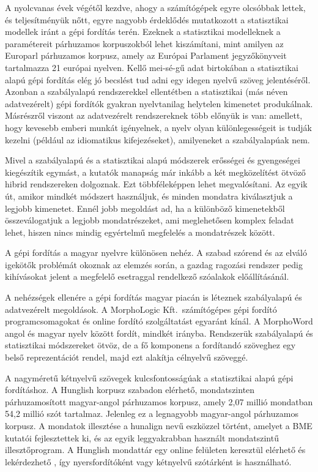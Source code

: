 \begin{multicols}{2}
  A nyolcvanas évek végétől kezdve, ahogy a számítógépek egyre olcsóbbak lettek, és teljesítményük nőtt, egyre nagyobb érdeklődés mutatkozott a statisztikai modellek iránt a gépi fordítás terén. Ezeknek a statisztikai modelleknek a paramétereit párhuzamos korpuszokból lehet kiszámítani, mint amilyen az Europarl pár\-hu\-za\-mos korpusz, amely az Európai Parlament jegyzőkönyveit tartalmazza 21 európai nyelven. Kellő mei-sé-gű adat birtokában a statisztikai alapú gépi fordítás elég jó becslést tud adni egy idegen nyelvű szöveg jelentéséről. Azonban a szabályalapú rendszerekkel ellentétben a statisztikai (más néven adatvezérelt) gépi fordítók gyakran nyelvtanilag helytelen kimenetet produkálnak. Másrészről vi\-szont az adatvezérelt rendszereknek több előnyük is van: amellett, hogy kevesebb emberi munkát igényelnek, a nyelv olyan különlegességeit is tudják kezelni (például az idiomatikus kifejezéseket), amilyeneket a szabályalapúak nem. 

  Mivel a szabályalapú és a statisztikai alapú módszerek erősségei és gyengeségei kiegészítik egymást, a kutatók manapság már inkább a két megközelítést ötvöző hib\-rid rendszereken dolgoznak. Ezt több\-fé\-le\-kép\-pen lehet megvalósítani. Az egyik út, amikor mindkét módszert használjuk, és minden mondatra kiválasztjuk a legjobb kimenetet. Ennél jobb megoldást ad, ha a különböző kimenetekből összeválogatjuk a legjobb mondatrészeket, ami meglehetősen komplex feladat lehet, hiszen nincs mindig egyértelmű megfelelés a mondatrészek között.  


  A gépi fordítás a magyar nyelvre különösen nehéz. A szabad szórend és az elváló igekötők problémát okoznak az elemzés során, a gazdag ragozási rendszer pedig kihívásokat jelent a megfelelő esetraggal rendelkező szóalakok előállításánál.

  A nehézségek ellenére a gépi fordítás ma\-gyar piacán is léteznek szabályalapú és adatvezérelt megoldások. A MorphoLogic Kft.\ számítógépes gépi fordító prog\-ram\-cso\-ma\-go\-kat és online fordító szolgáltatást egyaránt kínál. A MorphoWord angol és magyar nyelv között fordít, mindkét irányba. Rendszerük szabályalapú és statisztikai módszereket ötvöz, de a fő komponens a fordítandó szöveghez egy belső reprezentációt rendel, majd ezt alakítja célnyelvű szöveggé. 

  A nagyméretű kétnyelvű szövegek kulcsfontosságúak a statisztikai alapú gépi fordításhoz. A Hunglish korpusz szabadon elérhető, mondatszinten párhuzamosított magyar-angol párhuzamos korpusz, amely 2,07 millió mondatban 54,2 millió szót tartalmaz. Jelenleg ez a legnagyobb magyar-angol párhuzamos korpusz. A mondatok illesztése a hunalign nevű esz\-köz\-zel történt, amelyet a BME kutatói fej\-lesz\-tet\-tek ki, és az egyik leggyakrabban használt mondatszintű il\-lesz\-tő\-prog\-ram. A Hunglish mondattár egy online felületen keresztül elérhető és lekérdezhető \cite{hunglish}, így nyersfordítóként vagy kétnyelvű szótárként is használható.


\end{multicols}
